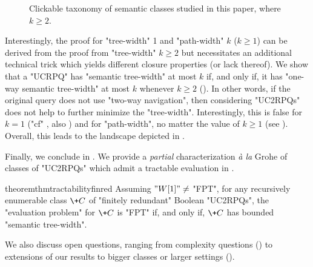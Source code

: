 \begin{figure}
{
	}
	\caption{
		\AP\label{fig:taxonomy-semantic}
		Clickable taxonomy of semantic classes studied in this paper, where $k \geq 2$.
	}
\end{figure}
Interestingly, the proof for "tree-width" 1 and "path-width" $k$ ($k \geq 1$)
can be derived from the proof from "tree-width" $k\geq 2$ but necessitates an
additional technical trick which yields different closure properties (or lack thereof).
We show that a "UCRPQ" has "semantic tree-width" at most $k$ if, and only if, it
has "one-way semantic tree-width" at most $k$ whenever $k \geq 2$
(). In other words, if the original query does not
use "two-way navigation", then considering "UC2RPQs" does not help to further minimize the "tree-width". Interestingly, this is false for $k=1$ ("cf" ,
also \cite[Proposition 6.4]{BarceloRomeroVardi2016SemanticAcyclicity}) and for "path-width", no matter the value of $k\geq 1$ (see ). Overall, this leads to
the landscape depicted in .

Finally, we conclude in .
We provide a \emph{partial} characterization \emph{à la} Grohe of classes of "UC2RPQs" which admit a tractable evaluation in .
\begin{restatable*}{theorem}{thmtractabilityfinred}
    \AP\label{thm:tractability-finred}
    Assuming $"W[1]" \neq $ "FPT", for any recursively enumerable class $\+C$ of "finitely redundant" Boolean "UC2RPQs", the "evaluation problem" for $\+C$ is "FPT" if, and only if, $\+C$ has bounded "semantic tree-width".
\end{restatable*}
We also discuss open questions, ranging from complexity
questions () to extensions of our results to bigger classes
or larger settings ().

